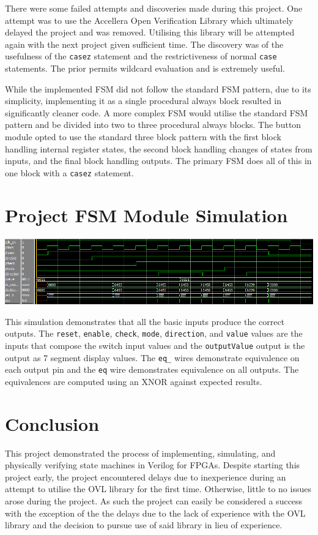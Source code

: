 \documentclass[12pt,letterpaper,titlepage]{article}
\begin{document}
\begin{raggedright}
There were some failed attempts and discoveries made during this project. One attempt was to use the Accellera Open Verification Library which ultimately delayed the project and was removed. Utilising this library will be attempted again with the next project given sufficient time. The discovery was of the usefulness of the \texttt{casez} statement and the restrictiveness of normal \texttt{case} statements. The prior permits wildcard evaluation and is extremely useful.

While the implemented FSM did not follow the standard FSM pattern, due to its simplicity, implementing it as a single procedural always block resulted in significantly cleaner code. A more complex FSM would utilise the standard FSM pattern and be divided into two to three procedural always blocks. The button module opted to use the standard three block pattern with the first block handling internal register states, the second block handling changes of states from inputs, and the final block handling outputs. The primary FSM does all of this in one block with a \texttt{casez} statement.
\clearpage
\section{Project FSM Module Simulation}
\begin{center}
\includegraphics[width=\textwidth]{tb_fsm}

\end{center}

This simulation demonstrates that all the basic inputs produce the correct outputs. The \texttt{reset}, \texttt{enable}, \texttt{check}, \texttt{mode}, \texttt{direction}, and \texttt{value} values are the inputs that compose the switch input values and the \texttt{outputValue} output is the output as 7 segment display values. The \texttt{eq\_} wires demonstrate equivalence on each output pin and the \texttt{eq} wire demonstrates equivalence on all outputs. The equivalences are computed using an XNOR against expected results.

\section{Conclusion}

This project demonstrated the process of implementing, simulating, and physically verifying state machines in Verilog for FPGAs. Despite starting this project early, the project encountered delays due to inexperience during an attempt to utilise the OVL library for the first time. Otherwise, little to no issues arose during the project. As such the project can easily be considered a success with the exception of the the delays due to the lack of experience with the OVL library and the decision to pursue use of said library in lieu of experience.

\end{raggedright}
\end{document}
